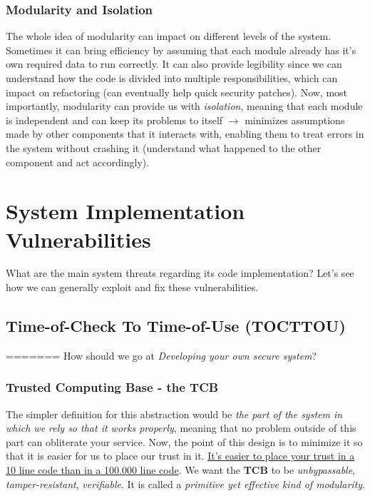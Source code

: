 \documentclass[11pt]{article}
\begin{document}
\subsubsection{Modularity and Isolation}
\label{sec:orga44d681}
The whole idea of modularity can impact on different levels of the system. Sometimes it can bring efficiency by assuming that each module already has it's own required data to run correctly. It can also provide legibility since we can understand how the code is divided into multiple responsibilities, which can impact on refactoring (can eventually help quick security patches). Now, most importantly, modularity can provide us with \emph{isolation}, meaning that each module is independent and can keep its problems to itself \(\to\) minimizes assumptions made by other components that it interacts with, enabling them to treat errors in the system without crashing it (understand what happened to the other component and act accordingly).

\section{System Implementation Vulnerabilities}
\label{sec:org021805c}
What are the main system threats regarding its code implementation? Let's see how we can generally exploit and fix these vulnerabilities.
\subsection{Time-of-Check To Time-of-Use (TOCTTOU)}
\label{sec:orga1a8ec9}
=======
\label{sec:org3b569e0}
How should we go at \emph{Developing your own secure system}?
\subsubsection{Trusted Computing Base - the \textbf{TCB}}
\label{sec:org46c32e9}
The simpler definition for this abstraction would be \emph{the part of the system in which we rely so that it works properly}, meaning that no problem outside of this part can obliterate your service. Now, the point of this design is to minimize it so that it is easier for us to place our trust in it. \uline{It's easier to place your trust in a 10 line code than in a 100.000 line code}. We want the \textbf{TCB} to be \emph{unbypassable}, \emph{tamper-resistant}, \emph{verifiable}. It is called a \emph{primitive yet effective kind of modularity}.
\end{document}
